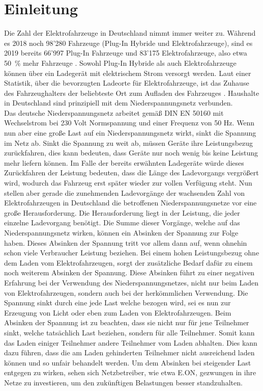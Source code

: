 \chapter{Einleitung}

Die Zahl der Elektrofahrzeuge in Deutschland nimmt immer weiter zu. Während es 2018 noch 98'280 Fahrzeuge (Plug-In Hybride und Elektrofahrzeuge), sind es 2019 bereits 66'997 Plug-In Fahrzeuge und 83'175 Elektrofahrzeuge, also etwa 50~\% mehr Fahrzeuge \cite{intro_stat_1}. Sowohl Plug-In Hybride als auch Elektrofahrzeuge können über ein Ladegerät mit elektrischem Strom versorgt werden. Laut einer Statistik, über die bevorzugten Ladeorte für Elektrofahrzeuge, ist das Zuhause des Fahrzeughalters der beliebteste Ort zum Aufladen des Fahrzeuges \cite{intro_stat_2}. Haushalte in Deutschland sind prinzipiell mit dem Niederspannungsnetz verbunden. \\
Das deutsche Niederspannungsnetz arbeitet gemäß DIN EN 50160 mit Wechselstrom bei 230 Volt Normspannung und einer Frequenz von 50 Hz. Wenn nun aber eine große Last auf ein Niederspannungsnetz wirkt, sinkt die Spannung im Netz ab. Sinkt die Spannung zu weit ab, müssen Geräte ihre Leistungsbezug zurückfahren, dies kann bedeuten, dass Geräte nur noch wenig bis keine Leistung mehr liefern können. Im Falle der bereits erwähnten Ladegeräte würde dieses Zurückfahren der Leistung bedeuten, dass die Länge des Ladevorgangs vergrößert wird, wodurch das Fahrzeug erst später wieder zur vollen Verfügung steht. Nun stellen aber gerade die zunehmenden Ladevorgänge der wachsenden Zahl von Elektrofahrzeugen in Deutschland die betroffenen Niederspannungsnetze vor eine große Herausforderung. Die Herausforderung liegt in der Leistung, die jeder einzelne Ladevorgang benötigt. Die Summe dieser Vorgänge, welche auf das Niederspannungsnetz wirken, können ein Absinken der Spannung zur Folge haben. Dieses Absinken der Spannung tritt vor allem dann auf, wenn ohnehin schon viele Verbraucher Leistung beziehen. Bei einem hohen Leistungsbezug ohne dem Laden vom Elektrofahrzeugen, sorgt der zusätzliche Bedarf dafür zu einem noch weiterem Absinken der Spannung. Diese Absinken führt zu einer negativen Erfahrung bei der Verwendung des Niederspannungsnetzes, nicht nur beim Laden von Elektrofahrzeugen, sondern auch bei der herkömmlichen Verwendung. Die Spannung sinkt durch eine jede Last welche bezogen wird, sei es nun zur Erzeugung von Licht oder eben zum Laden von Elektrofahrzeugen. Beim Absinken der Spannung ist zu beachten, dass sie nicht nur für jene Teilnehmer sinkt, welche tatsächlich Last beziehen, sondern für alle Teilnehmer. Somit kann das Laden einiger Teilnehmer andere Teilnehmer vom Laden abhalten. Dies kann dazu führen, dass die am Laden gehinderten Teilnehmer nicht ausreichend laden können und so unfair behandelt werden. Um dem Absinken bei steigender Last entgegen zu wirken, sehen sich Netzbetreiber, wie etwa E.ON, gezwungen in ihre Netze zu investieren, um den zukünftigen Belastungen besser standzuhalten. \\
